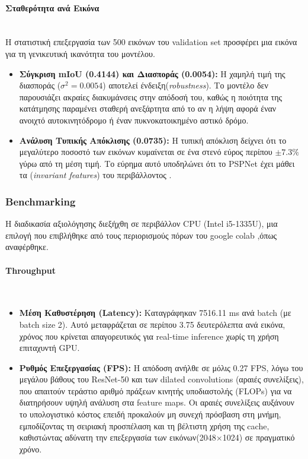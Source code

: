 \documentclass[12pt]{article}
\begin{document}
\paragraph{Σταθερότητα ανά Εικόνα}
\mbox{}\\
Η στατιστική επεξεργασία των 500 εικόνων του validation set προσφέρει μια εικόνα για τη γενικευτική ικανότητα του μοντέλου.
\begin{itemize}
    \item \textbf{Σύγκριση mIoU (0.4144) και Διασποράς (0.0054):} Η χαμηλή τιμή της διασποράς (\(\sigma^2 = 0.0054\)) αποτελεί ένδειξη(\textit{robustness}). Το μοντέλο δεν παρουσιάζει ακραίες διακυμάνσεις στην απόδοσή του, καθώς η ποιότητα της κατάτμησης παραμένει σταθερή ανεξάρτητα από το αν η λήψη αφορά έναν ανοιχτό αυτοκινητόδρομο ή έναν πυκνοκατοικημένο αστικό δρόμο.

    \item \textbf{Ανάλυση Τυπικής Απόκλισης (0.0735):} Η τυπική απόκλιση δείχνει ότι το μεγαλύτερο ποσοστό των εικόνων κυμαίνεται σε ένα στενό εύρος περίπου \(\pm 7.3\%\) γύρω από τη μέση τιμή. Το εύρημα αυτό υποδηλώνει ότι το PSPNet έχει μάθει τα (\textit{invariant features}) του περιβάλλοντος .
\end{itemize}


\subsubsection{Benchmarking}
Η διαδικασία αξιολόγησης διεξήχθη σε περιβάλλον CPU (Intel i5-1335U), μια επιλογή που επιβλήθηκε από τους περιορισμούς πόρων του google colab ,όπως αναφέρθηκε.
\paragraph{Throughput}
\mbox{}\\
\begin{itemize}
    \item \textbf{Μέση Καθυστέρηση (Latency):} 
    Καταγράφηκαν 7516.11 ms ανά batch (με batch size 2). Αυτό μεταφράζεται σε περίπου 3.75 δευτερόλεπτα ανά εικόνα, χρόνος που κρίνεται απαγορευτικός για real-time inference χωρίς τη χρήση επιταχυντή GPU.

    \item \textbf{Ρυθμός Επεξεργασίας (FPS):} 
    Η απόδοση ανήλθε σε μόλις 0.27 FPS, λόγω του μεγάλου βάθους του ResNet-50 και των dilated convolutions (αραιές συνελίξεις), που απαιτούν τεράστιο αριθμό πράξεων κινητής υποδιαστολής (FLOPs) για να διατηρήσουν υψηλή ανάλυση στα feature maps. Οι αραιές συνελίξεις αυξάνουν το υπολογιστικό κόστος επειδή προκαλούν μη συνεχή πρόσβαση στη μνήμη, εμποδίζοντας τη σειριακή προσπέλαση και τη βέλτιστη χρήση της cache, καθιστώντας αδύνατη την επεξεργασία των εικόνων(2048×1024) σε πραγματικό χρόνο.
\end{itemize}
\end{document}
